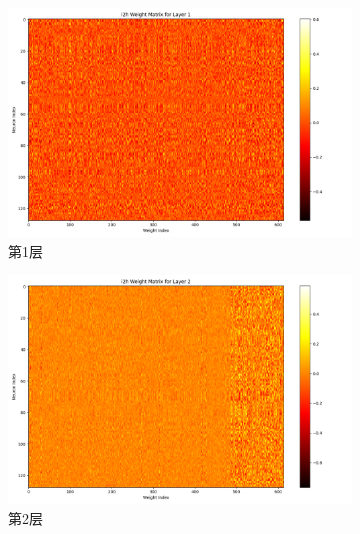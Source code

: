     \begin{figure}[H]
        \centering
        \begin{subfigure}{0.3\textwidth}
            \includegraphics[width=\linewidth]{../output/rnn/with scheduler/Weight Matrix for Layer 1.png}
            \caption{第1层}
            \label{fig:rnnweightmatrixforlayer1withscheduler}
        \end{subfigure}
        \hfill
        \begin{subfigure}{0.3\textwidth}
            \includegraphics[width=\linewidth]{../output/rnn/with scheduler/Weight Matrix for Layer 2.png}
            \caption{第2层}
            \label{fig:rnnweightmatrixforlayer2withscheduler}
        \end{subfigure}
        \hfill
        \begin{subfigure}{0.3\textwidth}

\end{subfigure}
\end{figure}
